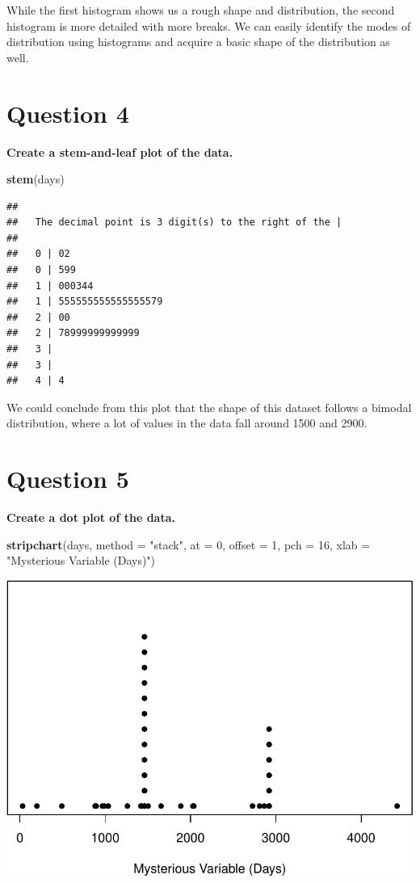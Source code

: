 \documentclass[
]{book}
\newenvironment{Shaded}{\begin{snugshade}}{\end{snugshade}}
\newcommand{\AttributeTok}[1]{\textcolor[rgb]{0.13,0.29,0.53}{#1}}
\newcommand{\DecValTok}[1]{\textcolor[rgb]{0.00,0.00,0.81}{#1}}
\newcommand{\FunctionTok}[1]{\textcolor[rgb]{0.13,0.29,0.53}{\textbf{#1}}}
\newcommand{\NormalTok}[1]{#1}
\newcommand{\StringTok}[1]{\textcolor[rgb]{0.31,0.60,0.02}{#1}}
\begin{document}
While the first histogram shows us a rough shape and distribution, the second histogram is more detailed with more breaks. We can easily identify the modes of distribution using histograms and acquire a basic shape of the distribution as well.

\section{Question 4}\label{question-4}

\textbf{Create a stem-and-leaf plot of the data.}

\begin{Shaded}
\begin{Highlighting}[]
\FunctionTok{stem}\NormalTok{(days)}
\end{Highlighting}
\end{Shaded}

\begin{verbatim}
## 
##   The decimal point is 3 digit(s) to the right of the |
## 
##   0 | 02
##   0 | 599
##   1 | 000344
##   1 | 555555555555555579
##   2 | 00
##   2 | 78999999999999
##   3 | 
##   3 | 
##   4 | 4
\end{verbatim}

We could conclude from this plot that the shape of this dataset follows a bimodal distribution, where a lot of values in the data fall around 1500 and 2900.

\section{Question 5}\label{question-5}

\textbf{Create a dot plot of the data.}

\begin{Shaded}
\begin{Highlighting}[]
\FunctionTok{stripchart}\NormalTok{(days, }\AttributeTok{method =} \StringTok{"stack"}\NormalTok{, }\AttributeTok{at =} \DecValTok{0}\NormalTok{, }\AttributeTok{offset =} \DecValTok{1}\NormalTok{, }\AttributeTok{pch =} \DecValTok{16}\NormalTok{, }\AttributeTok{xlab =} \StringTok{"Mysterious Variable (Days)"}\NormalTok{)}
\end{Highlighting}
\end{Shaded}

\begin{center}\includegraphics[width=0.8\linewidth]{_main_files/figure-latex/unnamed-chunk-5-1} \end{center}
\end{document}
